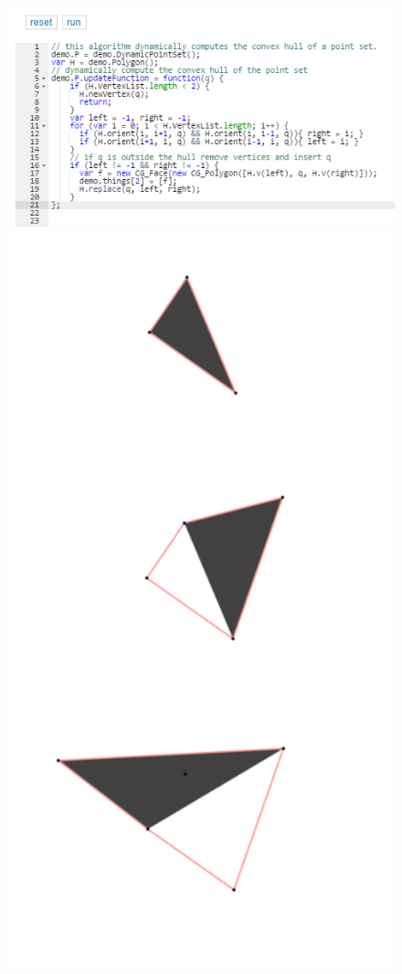 \documentclass[a4paper,UKenglish]{lipics-v2016}
\begin{document}
\begin{figure}[htbp]
  \centering 
  \includegraphics[scale=0.84]{figures/demo0.png}
  \includegraphics[scale=0.195]{figures/figs.png}

\end{figure}
\end{document}
